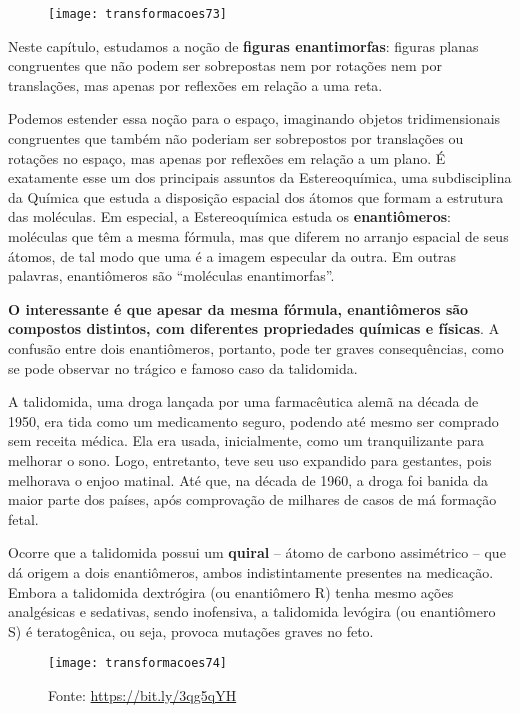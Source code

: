 \begin{figure}[H]
\centering

\texttt{[image: transformacoes73]}

\end{figure}


Neste capítulo, estudamos a noção de \textbf{figuras enantimorfas}: figuras planas congruentes que não podem ser sobrepostas nem por rotações nem por translações, mas apenas por reflexões em relação a uma reta. 

Podemos estender essa noção para o espaço, imaginando objetos tridimensionais congruentes que também não poderiam ser sobrepostos por translações ou rotações no espaço, mas apenas por reflexões em relação a um plano. É exatamente esse um dos principais assuntos da Estereoquímica, uma subdisciplina da Química que estuda a disposição espacial dos átomos que formam a estrutura das moléculas. Em especial, a Estereoquímica estuda os \textbf{enantiômeros}: moléculas que têm a mesma fórmula, mas que diferem no arranjo espacial de seus átomos, de tal modo que uma é a imagem especular da outra. Em outras palavras, enantiômeros são “moléculas enantimorfas”. 

\textbf{O interessante é que apesar da mesma fórmula, enantiômeros são compostos distintos, com diferentes propriedades químicas e físicas}. A confusão entre dois enantiômeros, portanto, pode ter graves consequências, como se pode observar no trágico e famoso caso da talidomida.

A talidomida, uma droga lançada por uma farmacêutica alemã na década de 1950, era tida como um medicamento seguro, podendo até mesmo ser comprado sem receita médica. Ela era usada, inicialmente, como um tranquilizante para melhorar o sono. Logo, entretanto, teve seu uso expandido para gestantes, pois melhorava o enjoo matinal. Até que, na década de 1960, a droga foi banida da maior parte dos países, após comprovação de milhares de casos de má formação fetal. 

Ocorre que a talidomida possui um \textbf{quiral} – átomo de carbono assimétrico – que dá origem a dois enantiômeros, ambos indistintamente presentes na medicação. Embora a talidomida dextrógira (ou enantiômero R) tenha mesmo ações analgésicas e sedativas, sendo inofensiva, a talidomida levógira (ou enantiômero S) é teratogênica, ou seja, provoca mutações graves no feto.
 

\begin{figure}[H]
\centering

\texttt{[image: transformacoes74]}
\caption{Fonte: \url{https://bit.ly/3qg5qYH}}
\label{}
\end{figure}


